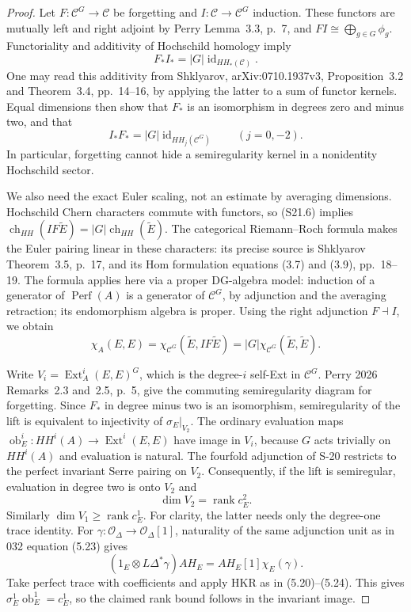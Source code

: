 \begin{proof}
Let $F:\mathcal C^G\to\mathcal C$ be forgetting and
$I:\mathcal C\to\mathcal C^G$ induction. These functors
are mutually left and right adjoint by Perry Lemma~3.3,
p.~7, and $FI\cong\bigoplus_{g\in G}\phi_g$.
Functoriality and additivity of Hochschild homology imply
\[
 F_*I_*=|G|\operatorname{id}_{HH_*(\mathcal C)}.
\]
One may read this additivity from Shklyarov, arXiv:0710.1937v3,
Proposition~3.2 and Theorem~3.4, pp.~14--16, by applying
the latter to a sum of functor kernels.
Equal dimensions then show that $F_*$ is an isomorphism
in degrees zero and minus two, and that
\[
 I_*F_*=|G|\operatorname{id}_{HH_j(\mathcal C^G)}
       \qquad(j=0,-2).
 \tag{S21.6}
\]
In particular, forgetting cannot hide a semiregularity
kernel in a nonidentity Hochschild sector.

We also need the exact Euler scaling, not an estimate by
averaging dimensions. Hochschild Chern characters commute
with functors, so (S21.6) implies
$\operatorname{ch}_{HH}(IF\widetilde E)
=|G|\operatorname{ch}_{HH}(\widetilde E)$.
The categorical Riemann--Roch formula makes the Euler
pairing linear in these characters: its precise source is
Shklyarov Theorem~3.5, p.~17, and its Hom formulation
equations (3.7) and (3.9), pp.~18--19.
The formula applies here via a proper DG-algebra model:
induction of a generator of $\operatorname{Perf}(A)$ is
a generator of $\mathcal C^G$, by adjunction and the
averaging retraction; its endomorphism algebra is proper.
Using the right adjunction $F\dashv I$, we obtain
\[
 \chi_A(E,E)
 =\chi_{\mathcal C^G}(\widetilde E,IF\widetilde E)
 =|G|\chi_{\mathcal C^G}(\widetilde E,\widetilde E).
 \tag{S21.7}
\]

Write $V_i=\operatorname{Ext}^i_A(E,E)^G$, which is the
degree-$i$ self-Ext in $\mathcal C^G$.
Perry 2026 Remarks~2.3 and~2.5, p.~5, give the commuting
semiregularity diagram for forgetting. Since $F_*$ in
degree minus two is an isomorphism, semiregularity of the
lift is equivalent to injectivity of
$\sigma_E|_{V_2}$.
The ordinary evaluation maps
$\operatorname{ob}_E^i:HH^i(A)\to\operatorname{Ext}^i(E,E)$
have image in $V_i$, because $G$ acts trivially on
$HH^i(A)$ and evaluation is natural.
The fourfold adjunction of S-20 restricts to the perfect
invariant Serre pairing on $V_2$. Consequently, if the
lift is semiregular, evaluation in degree two is onto
$V_2$ and
\[
 \dim V_2=\operatorname{rank}c_E^2.
 \tag{S21.8}
\]
Similarly $\dim V_1\ge\operatorname{rank}c_E^1$.
For clarity, the latter needs only the degree-one trace
identity. For $\gamma:\mathcal O_\Delta\to
\mathcal O_\Delta[1]$, naturality of the same adjunction
unit as in 032 equation (5.23) gives
\[
 (1_E\otimes L\Delta^*\gamma)AH_E
     =AH_E[1]\chi_E(\gamma).
\]
Take perfect trace with coefficients and apply HKR as in
(5.20)--(5.24). This gives
$\sigma_E^1\operatorname{ob}_E^1=c_E^1$,
so the claimed rank bound follows in the invariant image.


\end{proof}
